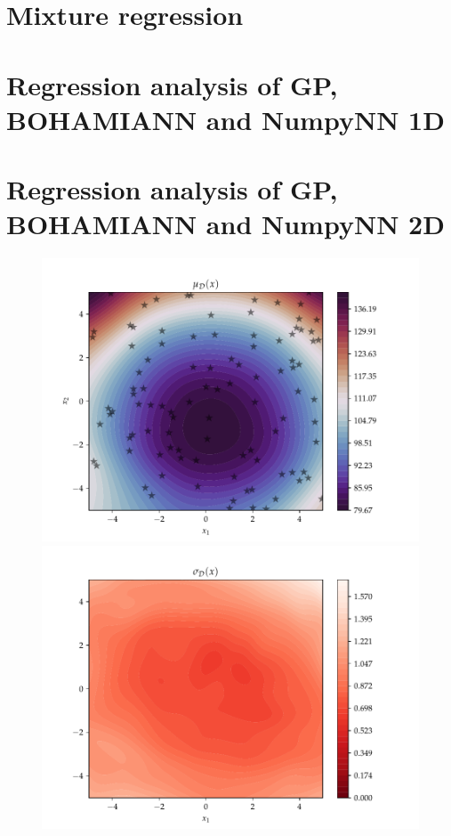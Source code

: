 \section{Mixture regression}




\section{Regression analysis of GP, BOHAMIANN and NumpyNN 1D}

\section{Regression analysis of GP, BOHAMIANN and NumpyNN 2D}

\begin{figure}[h]
  \centering
  \begin{minipage}[b]{0.49\textwidth}
   \includegraphics[trim=1.2cm 0.7cm 2cm 1cm,clip,width=\textwidth]{Figures/coco_reg/f1_BOHAMIANN2.pdf}
  \end{minipage}
  \hfill
  \begin{minipage}[b]{0.49\textwidth}
    \includegraphics[trim=1.2cm 0.7cm 2cm 1cm,clip,width=\textwidth]{Figures/coco_reg/f1_BOHAMIANN3.pdf}
   \end{minipage}
  

\end{figure}
